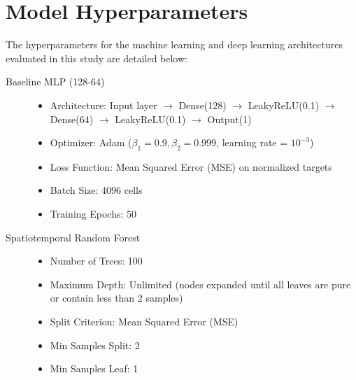 \section{Model Hyperparameters}
\label{sec:hyperparameters}

The hyperparameters for the machine learning and deep learning architectures evaluated in this study are detailed below:

\begin{description}
    \item[Baseline MLP (128-64)]
    \begin{itemize}
        \item Architecture: Input layer $\to$ Dense(128) $\to$ LeakyReLU(0.1) $\to$ Dense(64) $\to$ LeakyReLU(0.1) $\to$ Output(1)
        \item Optimizer: Adam ($\beta_1 = 0.9, \beta_2 = 0.999$, learning rate = $10^{-3}$)
        \item Loss Function: Mean Squared Error (MSE) on normalized targets
        \item Batch Size: 4096 cells
        \item Training Epochs: 50
    \end{itemize}

    \item[Spatiotemporal Random Forest]
    \begin{itemize}
        \item Number of Trees: 100
        \item Maximum Depth: Unlimited (nodes expanded until all leaves are pure or contain less than 2 samples)
        \item Split Criterion: Mean Squared Error (MSE)
        \item Min Samples Split: 2
        \item Min Samples Leaf: 1
    \end{itemize}


\end{description}
